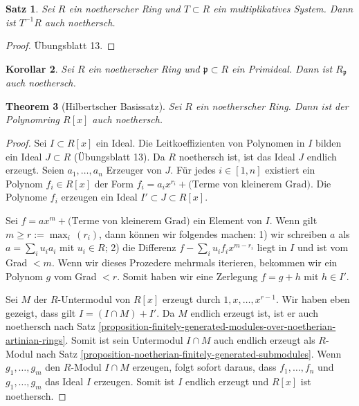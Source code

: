 \documentclass[reqno,12pt]{article}
\numberwithin{equation}{section}
\theoremstyle{plain}
\newtheorem{thm}{Theorem}[section]
\newtheorem{proposition}[thm]{Satz}
\newtheorem{cor}[thm]{Korollar}
\theoremstyle{definition}
\begin{document}
\begin{proposition}
Sei $R$ ein noetherscher Ring und $T \subset R$ ein multiplikatives System. Dann ist $T^{-1}R$ auch noethersch.
\end{proposition}

\begin{proof}
Übungsblatt 13.
\end{proof}


\begin{cor}
Sei $R$ ein noetherscher Ring und $\mathfrak{p} \subset R$ ein Primideal. Dann ist $R_{\mathfrak{p}}$ auch noethersch.
\end{cor}



\begin{thm}[Hilbertscher Basissatz]\label{theorem-hilbert-basis}
Sei $R$ ein noetherscher Ring. Dann ist der Polynomring $R[x]$ auch noethersch.
\end{thm}

\begin{proof}
Sei $I \subset R[x]$ ein Ideal. Die Leitkoeffizienten von Polynomen in $I$ bilden ein Ideal $J \subset R$ (Übungsblatt 13). Da $R$ noethersch ist, ist das Ideal $J$ endlich erzeugt. Seien $a_1, \dots, a_n$ Erzeuger von $J$. Für jedes $i \in [1,n]$ existiert ein Polynom $f_i \in R[x]$ der Form $f_i = a_ix^{r_i} + \text{(Terme von kleinerem Grad)}$. Die Polynome $f_i$ erzeugen ein Ideal $I' \subset J \subset R[x]$.

Sei $f = a x^m + \text{(Terme von kleinerem Grad)}$ ein Element von $I$. Wenn gilt $m \geq r := \max_i \, (r_i)$, dann können wir folgendes machen: 1) wir schreiben $a$ als $a = \sum_i u_i a_i$ mit $u_i \in R$; 2) die Differenz $f - \sum_i u_i f_i x^{m-r_i}$ liegt in $I$ und ist vom Grad $< m$. Wenn wir dieses Prozedere mehrmals iterieren, bekommen wir ein Polynom $g$ vom Grad $< r$. Somit haben wir eine Zerlegung $f = g + h$ mit $h \in I'$.

Sei $M$ der $R$-Untermodul von $R[x]$ erzeugt durch $1, x , \dots, x^{r-1}$.
Wir haben eben gezeigt, dass gilt $I = (I \cap M) + I'$. Da $M$ endlich erzeugt ist, ist er auch noethersch nach Satz
\ref{proposition-finitely-generated-modules-over-noetherian-artinian-rings}.
Somit ist sein Untermodul $I \cap M$ auch endlich erzeugt als $R$-Modul nach Satz
\ref{proposition-noetherian-finitely-generated-submodules}. Wenn $g_1, \dots, g_m$ den $R$-Modul $I \cap M$ erzeugen,
folgt sofort daraus, dass $f_1, \dots, f_n$ und $g_1, \dots, g_m$ das Ideal $I$ erzeugen. Somit ist $I$ endlich erzeugt und $R[x]$ ist noethersch.
\end{proof}
\end{document}

